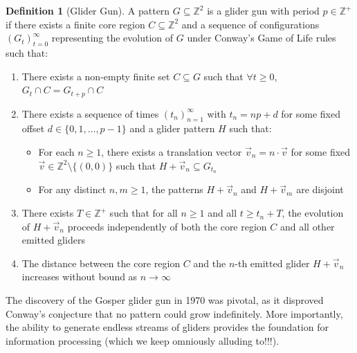 \documentclass{article}
\theoremstyle{definition}
\newtheorem{definition}{Definition}[section]
\theoremstyle{plain}
\theoremstyle{plain}
\begin{document}
\begin{definition}[Glider Gun]
A pattern $G \subseteq \mathbb{Z}^2$ is a glider gun with period $p \in \mathbb{Z}^+$ if there exists a finite core region $C \subseteq \mathbb{Z}^2$ and a sequence of configurations $(G_t)_{t=0}^{\infty}$ representing the evolution of $G$ under Conway's Game of Life rules such that:
\begin{enumerate}
  \item There exists a non-empty finite set $C \subseteq G$ such that $\forall t \geq 0$, $G_t \cap C = G_{t+p} \cap C$
  
  \item There exists a sequence of times $(t_n)_{n=1}^{\infty}$ with $t_n = np + d$ for some fixed offset $d \in \{0, 1, \ldots, p-1\}$ and a glider pattern $H$ such that:
    \begin{itemize}
      \item For each $n \geq 1$, there exists a translation vector $\vec{v}_n = n \cdot \vec{v}$ for some fixed $\vec{v} \in \mathbb{Z}^2 \setminus \{(0,0)\}$ such that $H + \vec{v}_n \subseteq G_{t_n}$
      \item For any distinct $n, m \geq 1$, the patterns $H + \vec{v}_n$ and $H + \vec{v}_m$ are disjoint
    \end{itemize}
    
  \item There exists $T \in \mathbb{Z}^+$ such that for all $n \geq 1$ and all $t \geq t_n + T$, the evolution of $H + \vec{v}_n$ proceeds independently of both the core region $C$ and all other emitted gliders
  
  \item The distance between the core region $C$ and the $n$-th emitted glider $H + \vec{v}_n$ increases without bound as $n \to \infty$
\end{enumerate}
\end{definition}



The discovery of the Gosper glider gun in 1970 was pivotal, as it disproved Conway's conjecture that no pattern could grow indefinitely. More importantly, the ability to generate endless streams of gliders provides the foundation for information processing (which we keep omniously alluding to!!!).
\end{document}

